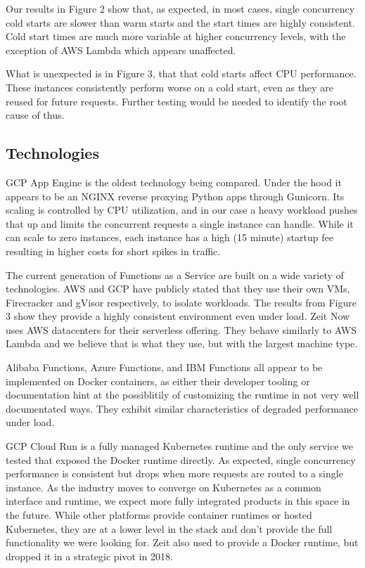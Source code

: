 \documentclass[11pt]{article}
\begin{document}
Our results in Figure 2 %
show that, as expected, in most cases,
single concurrency cold starts are slower than warm starts
and the start times are highly consistent.
Cold start times are much more variable at higher concurrency levels,
with the exception of AWS Lambda which appears unaffected.

What is unexpected is in Figure 3, %
that that cold starts affect CPU performance.
These instances consistently perform worse on a cold start,
even as they are reused for future requests.
Further testing would be needed to identify the root cause of thus.

\subsection{Technologies}
GCP App Engine is the oldest technology being compared.
Under the hood it appears to be an NGINX reverse proxying Python apps through Gunicorn.
Its scaling is controlled by CPU utilization,
and in our case a heavy workload pushes that up
and limits the concurrent requests a single instance can handle.
While it can scale to zero instances,
each instance has a high (15 minute) startup fee %
resulting in higher costs for short spikes in traffic.

The current generation of Functions as a Service
are built on a wide variety of technologies.
AWS and GCP have publicly stated that they use their own VMs,
Firecracker and gVisor respectively, to isolate workloads.
The results from Figure 3 %
show they provide a highly consistent environment even under load.
Zeit Now uses AWS datacenters %
for their serverless offering.
They behave similarly to AWS Lambda
and we believe that is what they use, but with the largest machine type.

Alibaba Functions, Azure Functions, and IBM Functions
all appear to be implemented on Docker containers,
as either their developer tooling or documentation
hint at the possiblitily of customizing the runtime
in not very well documentated ways.
They exhibit similar characteristics of degraded performance under load.

GCP Cloud Run is a fully managed Kubernetes runtime and
the only service we tested that exposed the Docker runtime directly.
As expected, single concurrency performance is consistent
but drops when more requests are routed to a single instance.
As the industry moves to converge on Kubernetes as a common interface and runtime,
we expect more fully integrated products in this space in the future.
While other platforms provide container runtimes or hosted Kubernetes,
they are at a lower level in the stack and don't provide the full functionality we were looking for.
Zeit also used to provide a Docker runtime, but dropped it in a strategic pivot in 2018.
\end{document}
